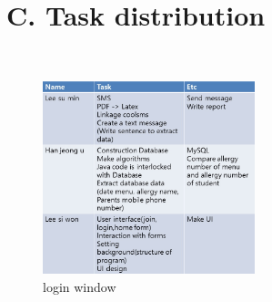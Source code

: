 \documentclass[a4paper,11pt]{IEEEtran}
\begin{document}
{\section*{C. Task distribution}
~\\
\begin{figure}[!h]
        \centering
        \includegraphics[width=0.55\textwidth, height=0.6\textheight]{ts.jpg}
        \caption{login window}
        \label{fig1}
\end{figure}
~\\
}
\end{document}
